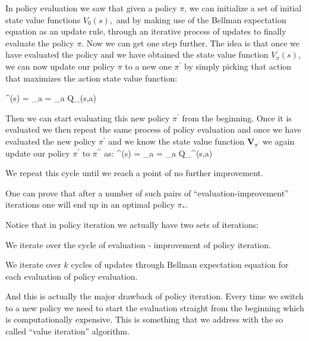 In policy evaluation we saw that given a policy $\pi$, we can initialize a set of initial state value functions $V_0
(s),$ and by making use of the Bellman expectation equation as an update rule, through an iterative process of
updates to finally evaluate the policy $\pi$. Now we can get one step further. The idea is that once we have
evaluated the policy and we have obtained the state value function $V_{\pi} (s)$, we can now update our policy $\pi$
to a new one $\pi^\prime$ by simply picking that action that maximizes the action state value function:

\bse
\pi^\prime(s) = \argmax_{a}  = \argmax_{a} Q_\pi(s,a)
\ese

Then we can start evaluating this new policy $\pi^\prime$ from the beginning. Once it is evaluated we then repeat
the same process of policy evaluation and once we have evaluated the new policy $\pi^\prime$ and we know the state
value function $\boldsymbol{V}_{\pi^\prime}$ we again update our policy $\pi^{\prime}$ to $\pi^{\prime\prime}$ as:
\bse
\pi^{\prime\prime}(s) = \argmax_{a}  = \argmax_{a} Q_{\pi^\prime}(s,a)
\ese

We repeat this cycle until we reach a point of no further improvement.

\vspace{3pt}


One can prove that after a number of such pairs of ``evaluation-improvement'' iterations one will end up in an optimal
policy $\pi_*$.


Notice that in policy iteration we actually have two sets of iterations:
\bit
\item We iterate over the cycle of evaluation - improvement of policy iteration.
\item We iterate over $k$ cycles of updates through Bellman expectation equation for each evaluation of policy
evaluation.
\eit

And this is actually the major drawback of policy iteration. Every time we switch to a new policy we need to start
the evaluation straight from the beginning which is computationally expensive. This is something that we address with
the so called ``value iteration'' algorithm.

